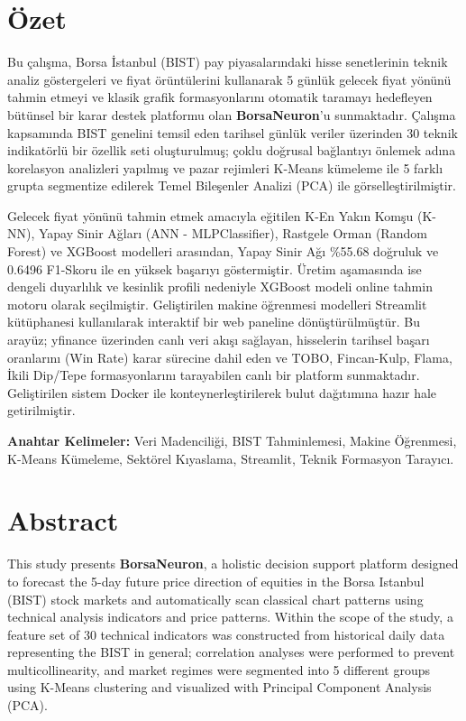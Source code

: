 \documentclass[12pt,a4paper]{report}
\begin{document}

\chapter*{Özet}
Bu çalışma, Borsa İstanbul (BIST) pay piyasalarındaki hisse senetlerinin teknik analiz göstergeleri ve fiyat örüntülerini kullanarak 5 günlük gelecek fiyat yönünü tahmin etmeyi ve klasik grafik formasyonlarını otomatik taramayı hedefleyen bütünsel bir karar destek platformu olan \textbf{BorsaNeuron}'u sunmaktadır. Çalışma kapsamında BIST genelini temsil eden tarihsel günlük veriler üzerinden 30 teknik indikatörlü bir özellik seti oluşturulmuş; çoklu doğrusal bağlantıyı önlemek adına korelasyon analizleri yapılmış ve pazar rejimleri K-Means kümeleme ile 5 farklı grupta segmentize edilerek Temel Bileşenler Analizi (PCA) ile görselleştirilmiştir.

Gelecek fiyat yönünü tahmin etmek amacıyla eğitilen K-En Yakın Komşu (K-NN), Yapay Sinir Ağları (ANN - MLPClassifier), Rastgele Orman (Random Forest) ve XGBoost modelleri arasından, Yapay Sinir Ağı \%55.68 doğruluk ve 0.6496 F1-Skoru ile en yüksek başarıyı göstermiştir. Üretim aşamasında ise dengeli duyarlılık ve kesinlik profili nedeniyle XGBoost modeli online tahmin motoru olarak seçilmiştir. Geliştirilen makine öğrenmesi modelleri Streamlit kütüphanesi kullanılarak interaktif bir web paneline dönüştürülmüştür. Bu arayüz; yfinance üzerinden canlı veri akışı sağlayan, hisselerin tarihsel başarı oranlarını (Win Rate) karar sürecine dahil eden ve TOBO, Fincan-Kulp, Flama, İkili Dip/Tepe formasyonlarını tarayabilen canlı bir platform sunmaktadır. Geliştirilen sistem Docker ile konteynerleştirilerek bulut dağıtımına hazır hale getirilmiştir.

\vspace*{1cm}
\noindent \textbf{Anahtar Kelimeler:} Veri Madenciliği, BIST Tahminlemesi, Makine Öğrenmesi, K-Means Kümeleme, Sektörel Kıyaslama, Streamlit, Teknik Formasyon Tarayıcı.

\newpage

\chapter*{Abstract}
This study presents \textbf{BorsaNeuron}, a holistic decision support platform designed to forecast the 5-day future price direction of equities in the Borsa Istanbul (BIST) stock markets and automatically scan classical chart patterns using technical analysis indicators and price patterns. Within the scope of the study, a feature set of 30 technical indicators was constructed from historical daily data representing the BIST in general; correlation analyses were performed to prevent multicollinearity, and market regimes were segmented into 5 different groups using K-Means clustering and visualized with Principal Component Analysis (PCA).
\end{document}
